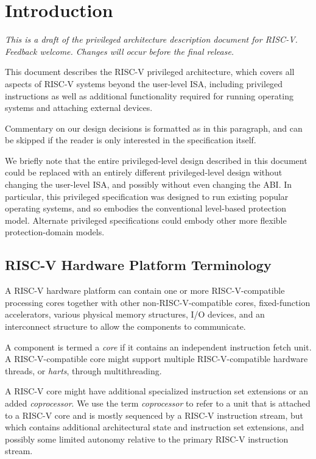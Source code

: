 \chapter{Introduction}

{\em This is a draft of the privileged architecture description
  document for RISC-V.  Feedback welcome.  Changes will occur before
  the final release. }

This document describes the RISC-V privileged architecture, which
covers all aspects of RISC-V systems beyond the user-level ISA,
including privileged instructions as well as additional functionality
required for running operating systems and attaching external devices.

\begin{commentary}
Commentary on our design decisions is formatted as in this paragraph,
and can be skipped if the reader is only interested in the
specification itself.
\end{commentary}

\begin{commentary}
We briefly note that the entire privileged-level design described in
this document could be replaced with an entirely different
privileged-level design without changing the user-level ISA, and
possibly without even changing the ABI.  In particular, this
privileged specification was designed to run existing popular
operating systems, and so embodies the conventional level-based
protection model.  Alternate privileged specifications could embody
other more flexible protection-domain models.
\end{commentary}

\section{RISC-V Hardware Platform Terminology}

A RISC-V hardware platform can contain one or more RISC-V-compatible
processing cores together with other non-RISC-V-compatible cores,
fixed-function accelerators, various physical memory structures, I/O
devices, and an interconnect structure to allow the components to
communicate.

A component is termed a {\em core} if it contains an independent
instruction fetch unit.  A RISC-V-compatible core might support
multiple RISC-V-compatible hardware threads, or {\em harts}, through
multithreading.

A RISC-V core might have additional specialized instruction set
extensions or an added {\em coprocessor}.  We use the term {\em
  coprocessor} to refer to a unit that is attached to a RISC-V core
and is mostly sequenced by a RISC-V instruction stream, but which
contains additional architectural state and instruction set
extensions, and possibly some limited autonomy relative to the
primary RISC-V instruction stream.

